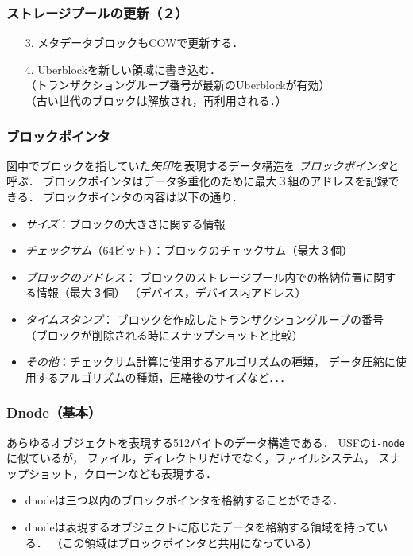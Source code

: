 \documentclass[unicode,handout]{beamer}                   %
\begin{document}
\begin{frame}[fragile]
  \frametitle{ストレージプールの更新（２）}
  \vfill
  \begin{enumerate}
    \item[3.] メタデータブロックもCOWで更新する．
    \item[4.] Uberblockを新しい領域に書き込む．\\
      （トランザクショングループ番号が最新のUberblockが有効）\\
      （古い世代のブロックは解放され，再利用される．）
  \end{enumerate}
  \vfill
\end{frame}

\begin{frame}[fragile]
  \frametitle{ブロックポインタ}
  図中でブロックを指していた\emph{矢印}を表現するデータ構造を
  \emph{ブロックポインタ}と呼ぶ．
  ブロックポインタはデータ多重化のために最大３組のアドレスを記録できる．
  ブロックポインタの内容は以下の通り．
  \vfill
  \begin{itemize}
  \item \emph{サイズ}：ブロックの大きさに関する情報
  \item \emph{チェックサム}（64ビット）：ブロックのチェックサム（最大３個）
  \item \emph{ブロックのアドレス}：
    ブロックのストレージプール内での格納位置に関する情報（最大３個）
    （デバイス，デバイス内アドレス）
  \item \emph{タイムスタンプ}：
    ブロックを作成したトランザクショングループの番号
    （ブロックが削除される時にスナップショットと比較）
  \item \emph{その他}：チェックサム計算に使用するアルゴリズムの種類，
    データ圧縮に使用するアルゴリズムの種類，圧縮後のサイズなど．．．
  \end{itemize}
  \vfill
\end{frame}

\begin{frame}[fragile]
  \frametitle{Dnode（基本）}
  あらゆるオブジェクトを表現する512バイトのデータ構造である．
  USFの\texttt{i-node}に似ているが，
  ファイル，ディレクトリだけでなく，ファイルシステム，
  スナップショット，クローンなども表現する．
  \vfill
  \centerline{}
  \vfill
  \begin{itemize}
  \item dnodeは三つ以内のブロックポインタを格納することができる．
  \item dnodeは表現するオブジェクトに応じたデータを格納する領域を持っている．
    （この領域はブロックポインタと共用になっている）
  \end{itemize}
  \vfill
\end{frame}
\end{document}
